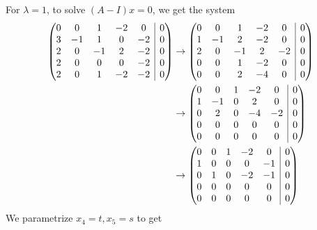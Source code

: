 \documentclass{eh-homework}
\begin{document}
\begin{question}{2}
\begin{enumerate}[label=(\alph*)]
        For \(\lambda = 1\), to solve \((A - I)x = 0\), we get the system
        \begin{align*}
            \left( \begin{array}{@{}ccccc|c@{}}
                0 & 0 & 1 & -2 & 0 & 0\\
                3 & -1 & 1 & 0 & -2 & 0\\
                2 & 0 & -1 & 2 & -2 & 0\\
                2 & 0 & 0 & 0 & -2 & 0\\
                2 & 0 & 1 & -2 & -2 & 0 \\
            \end{array} \right) &\to
            \left( \begin{array}{@{}ccccc|c@{}}
                0 & 0 & 1 & -2 & 0 & 0\\
                1 & -1 & 2 & -2 & 0 & 0\\
                2 & 0 & -1 & 2 & -2 & 0\\
                0 & 0 & 1 & -2 & 0 & 0\\
                0 & 0 & 2 & -4 & 0 & 0 \\
            \end{array} \right) \\
            &\to 
            \left( \begin{array}{@{}ccccc|c@{}}
                0 & 0 & 1 & -2 & 0 & 0\\
                1 & -1 & 0 & 2 & 0 & 0\\
                0 & 2 & 0 & -4 & -2 & 0\\
                0 & 0 & 0 & 0 & 0 & 0\\
                0 & 0 & 0 & 0 & 0 & 0 \\
            \end{array} \right) \\
            &\to 
            \left( \begin{array}{@{}ccccc|c@{}}
                0 & 0 & 1 & -2 & 0 & 0\\
                1 & 0 & 0 & 0 & -1 & 0\\
                0 & 1 & 0 & -2 & -1 & 0\\
                0 & 0 & 0 & 0 & 0 & 0\\
                0 & 0 & 0 & 0 & 0 & 0 \\
            \end{array} \right)
        \end{align*}
        We parametrize \(x_4 = t, x_5 = s\) to get

\end{enumerate}
\end{question}
\end{document}
